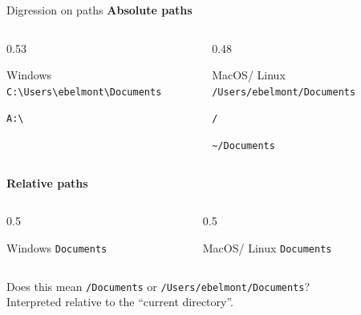 \documentclass[xcolor={svgnames,x11names,dvipsnames}]{beamer}
\begin{document}
\begin{frame}[fragile]{Digression on paths}
\textbf{Absolute paths}
\begin{columns}[t]
\begin{column}{0.53\textwidth}
\begin{block}{Windows}
\verb=C:\Users\ebelmont\Documents = 

\verb=A:\ =

\ 
\end{block}
\end{column}
\begin{column}{0.48\textwidth}
\begin{block}{MacOS/ Linux}
\verb=/Users/ebelmont/Documents=

\verb=/=

\verb=~/Documents=
\end{block}
\end{column}
\end{columns}

\textbf{Relative paths}
\begin{columns}[t]
\begin{column}{0.5\textwidth}
\begin{block}{Windows}
\verb=Documents=
\end{block}
\end{column}
\begin{column}{0.5\textwidth}
\begin{block}{MacOS/ Linux}
\verb=Documents=
\end{block}
\end{column}
\end{columns}
Does this mean \verb=/Documents= or \verb=/Users/ebelmont/Documents=?
\\Interpreted relative to the ``current directory''.
\end{frame}
\end{document}
